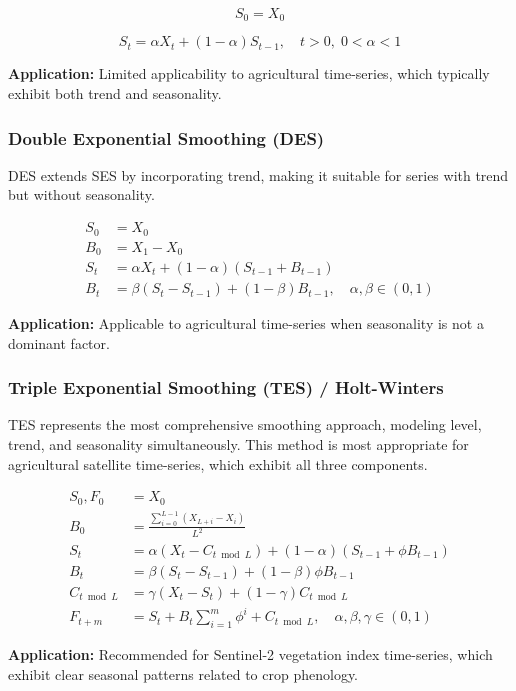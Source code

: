 \documentclass{article} %
\begin{document}
            \[
                S_0 = X_0
            \]

            \[
                S_t = \alpha X_t + (1 - \alpha) S_{t-1}, \quad t > 0, \; 0 < \alpha < 1
            \]

            \textbf{Application:} Limited applicability to agricultural time-series, which typically exhibit both trend and seasonality.

        \subsubsection{Double Exponential Smoothing (DES)}
            DES extends SES by incorporating trend, making it suitable for series with trend but without seasonality.

            \[
                \begin{aligned}
                S_0 &= X_0 \\
                B_0 &= X_1 - X_0 \\
                S_t &= \alpha X_t + (1 - \alpha)(S_{t-1} + B_{t-1}) \\
                B_t &= \beta (S_t - S_{t-1}) + (1 - \beta) B_{t-1}, \quad \alpha, \beta \in (0,1)
                \end{aligned}
            \]

            \textbf{Application:} Applicable to agricultural time-series when seasonality is not a dominant factor.

        \subsubsection{Triple Exponential Smoothing (TES) / Holt-Winters}
            TES represents the most comprehensive smoothing approach, modeling level, trend, and seasonality simultaneously. This method is most appropriate for agricultural satellite time-series, which exhibit all three components.

            \[
                \begin{aligned}
                S_0, F_0 &= X_0 \\
                B_0 &= \frac{\sum_{i=0}^{L-1} \left( X_{L+i} - X_i \right)}{L^2} \\
                S_t &= \alpha \left( X_t - C_{t \bmod L} \right) + (1 - \alpha)\left( S_{t-1} + \phi B_{t-1} \right) \\
                B_t &= \beta \left( S_t - S_{t-1} \right) + (1 - \beta)\phi B_{t-1} \\
                C_{t \bmod L} &= \gamma \left( X_t - S_t \right) + (1 - \gamma) C_{t \bmod L} \\
                F_{t+m} &= S_t + B_t \sum_{i=1}^{m} \phi^{i} + C_{t \bmod L}, \quad \alpha, \beta, \gamma \in (0,1)
                \end{aligned}
            \]

            \textbf{Application:} Recommended for Sentinel-2 vegetation index time-series, which exhibit clear seasonal patterns related to crop phenology.
\end{document}
